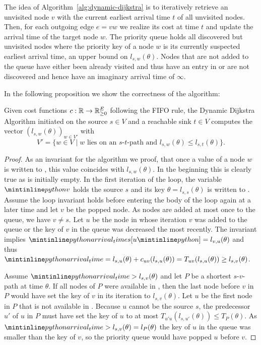 The idea of Algorithm~\ref{alg:dynamic-dijkstra} is to iteratively retrieve an unvisited node $v$ with the current earliest arrival time $t$ of all unvisited nodes.
Then, for each outgoing edge $e=vw$ we realize its cost at time $t$ and update the arrival time of the target node $w$.
The priority queue holds all discovered but unvisited nodes where the priority key of a node $w$ is its currently suspected earliest arrival time, an upper bound on $l_{s,w}(\theta)$.
Nodes that are not added to the queue have either been already visited and thus have an entry in  or are not discovered and hence have an imaginary arrival time of $\infty$.

In the following proposition we show the correctness of the algorithm:

\begin{proposition}
    Given cost functions $c:\mathbb{R} \rightarrow \mathbb{R}_{\geq0}^E$ following the FIFO rule, the Dynamic Dijkstra Algorithm initiated on the source $s\in V$ and a reachable sink $t\in V$ computes the vector $(l_{s,w}(\theta))_{w\in V'}$ with \[
        V' = \{ w\in V \mid \text{$w$ lies on an $s$-$t$-path and $l_{s,w}(\theta) \leq l_{s,t}(\theta)$} \}.
    \]
\end{proposition}
\begin{proof}
    As an invariant for the algorithm we proof, that once a value of a node $w$ is written to , this value coincides with $l_{s,w}(\theta)$.
    In the beginning this is clearly true as  is initially empty.
    In the first iteration of the loop, the variable $\code{v}$ holds the source $s$ and its key $\theta= l_{s,s}(\theta)$ is written to .
    Assume the loop invariant holds before entering the body of the loop again at a later time and let $v$ be the popped node.
    As nodes are added at most once to the queue, we have $v \neq s$.
    Let $u$ be the node in whose iteration $v$ was added to the queue or the key of $v$ in the queue was decreased the most recently.
    The invariant implies $\code{arrival_times[}u\code{]} = l_{v,u}(\theta)$ and thus $\code{arrival_time} = l_{s,u}(\theta) + c_{uv}(l_{s,u}(\theta)) = T_{uv}(l_{s,u}(\theta)) \geq l_{s,v}(\theta)$.

    Assume $\code{arrival_time} > l_{s,v}(\theta)$ and let $P$ be a shortest $s$-$v$-path at time $\theta$.
    If all nodes of $P$ were available in , then the last node before $v$ in $P$ would have set the key of $v$ in its iteration to $l_{s,v}(\theta)$.
    Let $u$ be the first node in $P$ that is not available in .
    Because $u$ cannot be the source $s$, the  predecessor $u'$ of $u$ in $P$ must have set the key of $u$ to at most $T_{u'u}(l_{s,u'}(\theta)) \leq T_P(\theta)$.
    As $\code{arrival_time}>l_{s,v}(\theta) = l_P(\theta)$ the key of $u$ in the queue was smaller than the key of $v$, so the priority queue would have popped $u$ before $v$.
\end{proof}

